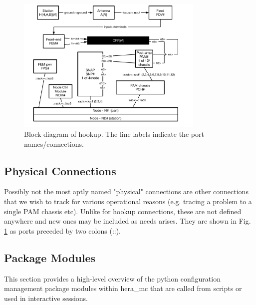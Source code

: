 \documentclass{article}
\begin{document}
\begin{figure}[H]
\includegraphics[width=0.8\textwidth]{hookup.pdf}
\centering
\caption{Block diagram of hookup.  The line labels indicate the port names/connections.}
\label{fig:hookup}
\end{figure}

\subsection{Physical Connections}
Possibly not the most aptly named "physical" connections are other connections that we wish to track for various operational reasons (e.g. tracing a problem to a single PAM chassis etc).  Unlike for hookup connections, these are not defined anywhere and new ones may be included as needs arises.  They are shown in Fig. \ref{fig:hookup} as ports preceded by two colons (::).

\subsection{Package Modules}
This section provides a high-level overview of the python configuration management package modules within hera\_mc that are called from scripts or used in interactive sessions.
\vspace{0.5cm}
\end{document}
